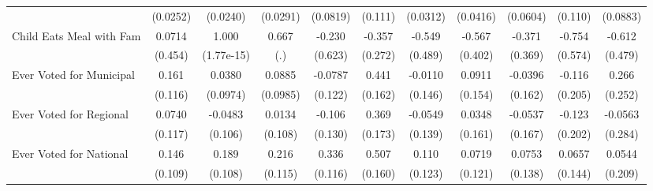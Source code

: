 {\begin{tabular}{l*{10}{c}}
            &    (0.0252)         &    (0.0240)         &    (0.0291)         &    (0.0819)         &     (0.111)         &    (0.0312)         &    (0.0416)         &    (0.0604)         &     (0.110)         &    (0.0883)         \\
\addlinespace
Child Eats Meal with Fam&      0.0714         &       1.000\sym{***}&       0.667         &      -0.230         &      -0.357         &      -0.549         &      -0.567         &      -0.371         &      -0.754         &      -0.612         \\
            &     (0.454)         &  (1.77e-15)         &         (.)         &     (0.623)         &     (0.272)         &     (0.489)         &     (0.402)         &     (0.369)         &     (0.574)         &     (0.479)         \\
\addlinespace
Ever Voted for Municipal&       0.161         &      0.0380         &      0.0885         &     -0.0787         &       0.441\sym{**} &     -0.0110         &      0.0911         &     -0.0396         &      -0.116         &       0.266         \\
            &     (0.116)         &    (0.0974)         &    (0.0985)         &     (0.122)         &     (0.162)         &     (0.146)         &     (0.154)         &     (0.162)         &     (0.205)         &     (0.252)         \\
\addlinespace
Ever Voted for Regional&      0.0740         &     -0.0483         &      0.0134         &      -0.106         &       0.369\sym{*}  &     -0.0549         &      0.0348         &     -0.0537         &      -0.123         &     -0.0563         \\
            &     (0.117)         &     (0.106)         &     (0.108)         &     (0.130)         &     (0.173)         &     (0.139)         &     (0.161)         &     (0.167)         &     (0.202)         &     (0.284)         \\
\addlinespace
Ever Voted for National&       0.146         &       0.189         &       0.216         &       0.336\sym{**} &       0.507\sym{**} &       0.110         &      0.0719         &      0.0753         &      0.0657         &      0.0544         \\
            &     (0.109)         &     (0.108)         &     (0.115)         &     (0.116)         &     (0.160)         &     (0.123)         &     (0.121)         &     (0.138)         &     (0.144)         &     (0.209)         \\
\bottomrule
\end{tabular}
}
